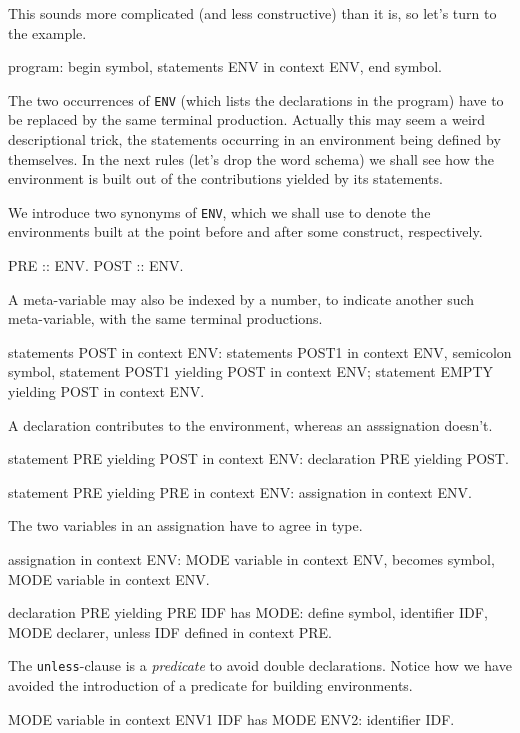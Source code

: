 This sounds more complicated (and less constructive) than it is, so let's
turn to the example.
\begin{elan}
program:
   begin symbol, statements ENV in context ENV, end symbol.
\end{elan}
The two occurrences of {\tt ENV} (which lists the declarations in the
program) have to be replaced by the same terminal production. Actually
this may seem a weird descriptional trick, the statements
occurring in an environment being defined by themselves.
In the next rules (let's drop the word schema) we
shall see how the environment is built out of the contributions yielded
by its statements.

We introduce two synonyms of {\tt ENV}, which we shall use to denote
the environments built at the point before and after some construct,
respectively.
\begin{elan}
PRE :: ENV.    POST :: ENV.
\end{elan}
A meta-variable may also be indexed by a number, to indicate another
such meta-variable, with the same terminal productions.
\begin{elan}
statements POST in context ENV:
   statements POST1 in context ENV, semicolon symbol,
        statement POST1 yielding POST in context ENV;
   statement EMPTY yielding POST in context ENV.
\end{elan}
A declaration contributes to the environment, whereas an asssignation doesn't.
\begin{elan}
statement PRE yielding POST in context ENV:
   declaration PRE yielding POST.
\end{elan}
\begin{elan}
statement PRE yielding PRE in context ENV:
   assignation in context ENV.
\end{elan}
The two variables in an assignation have to agree in type.
\begin{elan}
assignation in context ENV:
   MODE variable in context ENV,
      becomes symbol,
         MODE variable in context ENV.
\end{elan}
\begin{elan}
declaration PRE yielding PRE IDF has MODE:
   define symbol, identifier IDF, MODE declarer,
      unless IDF defined in context PRE.
\end{elan}
The {\tt unless}-clause
is a {\em predicate} to avoid double declarations. Notice how we have
avoided the introduction of a predicate for building environments.
\begin{elan}
MODE variable in context ENV1 IDF has MODE ENV2:
   identifier IDF.
\end{elan}
